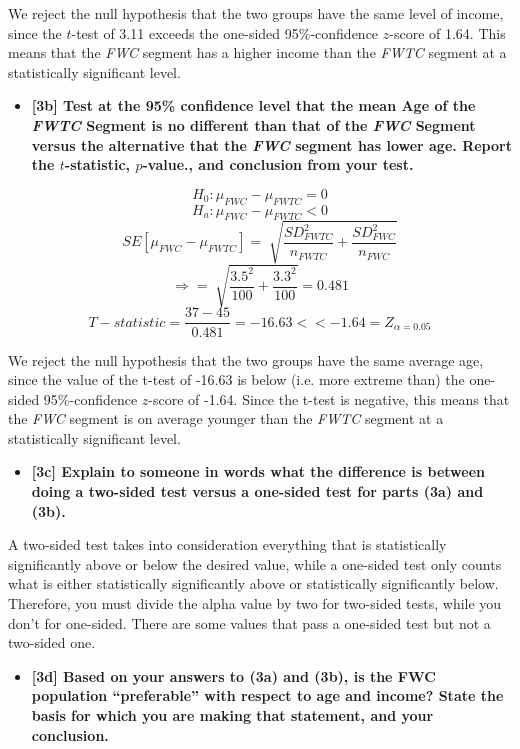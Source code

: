 \documentclass[10pt, oneside,spanish]{article}
\begin{document}
We reject the null hypothesis that the two groups have the same level of income, since the $t$-test of 3.11 exceeds the one-sided 95\%-confidence $z$-score of 1.64. This means that the \textit{FWC} segment has a higher income than the \textit{FWTC} segment at a statistically significant level.

\begin{itemize}
\item \textbf{ [3b]  Test at the 95\% confidence level that the mean Age of the \textit{FWTC} Segment is no different than that of the \textit{FWC} Segment versus the alternative that the \textit{FWC} segment has lower age.  Report the $t$-statistic, $p$-value., and conclusion from your test.   }
\end{itemize}

$$ H_0 :  \mu_{FWC} - \mu_{FWTC} =  0 $$
$$ H_a : \mu_{FWC} - \mu_{FWTC} <  0 $$
$$ SE[\mu_{FWC} - \mu_{FWTC}] = \sqrt[]{\frac{SD_{FWTC}^2}{n_{FWTC}} +  \frac{SD_{FWC}^2}{n_{FWC} }} $$
$$ \Rightarrow = \sqrt[]{\frac{ 3.5^2}{100} + \frac{3.3^2 }{100} } = 0.481 $$
$$T-statistic = \frac{37-45}{ 0.481} = -16.63 << -1.64 = Z_{\alpha=0.05}  $$

We reject the null hypothesis that the two groups have the same average age, since the value of the t-test of -16.63 is below (i.e. more extreme than) the one-sided 95\%-confidence $z$-score of -1.64. Since the t-test is negative, this means that the \textit{FWC} segment is on average younger than the \textit{FWTC} segment at a statistically significant level.

\begin{itemize}
\item \textbf{ [3c] Explain to someone in words what the difference is between doing a two-sided test versus a one-sided test for parts (3a) and (3b).    }
\end{itemize}

A two-sided test takes into consideration everything that is statistically significantly above or below the desired value, while a one-sided test only counts what is either statistically significantly above or statistically significantly below.  Therefore, you must divide the alpha value by two for two-sided tests, while you don’t for one-sided.  There are some values that pass a one-sided test but not a two-sided one.



\begin{itemize}
\item \textbf{ [3d]   Based on your answers to (3a) and (3b), is the FWC population “preferable” with respect to age and income? State the basis for which you are making that statement, and your conclusion.  }
\end{itemize}
\end{document}
